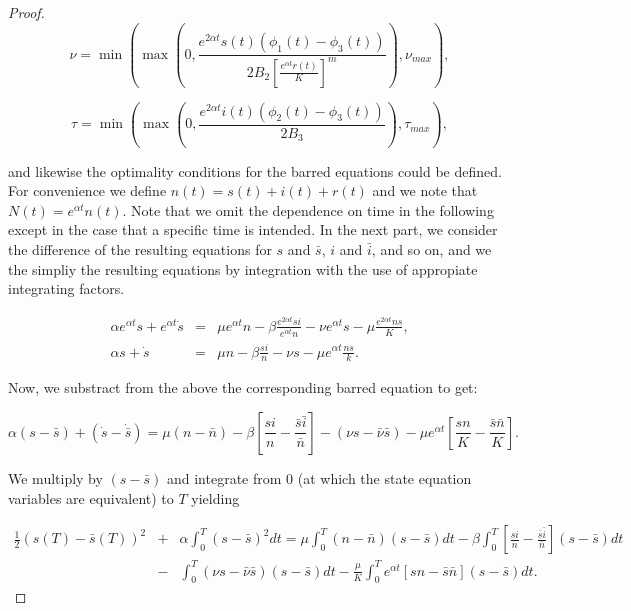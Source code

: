 \begin{proof}
\begin{equation}\label{eq.1.4.33}
\nu=\min\left(\max\left(0,\frac{e^{2\alpha 
t}s(t)(\phi_1(t)-\phi_3(t))}{2B_2\left[\frac{e^{\alpha 
t}r(t)}{K}\right]^m}\right),\nu_{max}\right),
\end{equation}

\begin{equation}\label{eq.1.4.34}
\tau=\min\left(\max\left(0,\frac{e^{2\alpha 
t}i(t)(\phi_2(t)-\phi_3(t))}{2B_3}\right),\tau_{max}\right),
\end{equation}

and likewise the optimality conditions for the barred equations could be 
defined. For convenience we define $n(t)=s(t)+i(t)+r(t)$ and we note that 
$N(t)=e^{\alpha t}n(t)$. Note that we omit the dependence on time in the 
following except in the case that a specific time is intended. In the next 
part, we consider the difference of the resulting equations for $s$ and 
$\bar{s}$, $i$ and $\bar{i}$, and so on, and we the simpliy the resulting 
equations by integration with the use of appropiate integrating factors.

\begin{eqnarray*}
	\alpha e^{\alpha t}s+ e^{\alpha t}\dot{s}&=&\mu e^{\alpha t}n-\beta 
	\frac{e^{2\alpha t}si}{e^{\alpha t} n}-\nu e^{\alpha t} s-\mu 
	\frac{e^{2\alpha t} ns}{K},\\
	\alpha s+\dot{s}&=&\mu n-\beta \frac{si}{n}-\nu s-\mu e^{\alpha t}\frac{n 
	s}{k}.
\end{eqnarray*}

Now, we substract from the above the corresponding barred equation to get:

\begin{equation*}
\alpha 
(s-\bar{s})+(\dot{s}-\dot{\bar{s}})=\mu(n-\bar{n})-\beta\left[\frac{si}{n}-\frac{\bar{s}\bar{i}}{\bar{n}}\right]-(\nu
 s-\bar{\nu}\bar{s})-\mu e^{\alpha 
t}\left[\frac{sn}{K}-\frac{\bar{s}\bar{n}}{K}\right]. 
\end{equation*}

We multiply by $(s-\bar{s})$ and integrate from 0 (at which  the state equation 
variables are equivalent) to $T$ yielding

\begin{eqnarray}
\frac{1}{2}(s(T)-\bar{s}(T))^2&+&\alpha\int_{0}^{T}(s-\bar{s})^2dt=\mu\int_{0}^{T}(n-\bar{n})(s-\bar{s})dt-\beta\int_{0}^{T}\left[\frac{si}{n}-\frac{\bar{s}\bar{i}}{\bar{n}}\right](s-\bar{s})dt\nonumber\\
&-&\int_{0}^{T}(\nu s-\bar{\nu}\bar{s})(s-\bar{s})dt-\frac{\mu}{K}\int_{0}^{T} 
e^{\alpha t}\left[sn-\bar{s}\bar{n}\right](s-\bar{s})dt. \label{eq.1.4.35}
\end{eqnarray}


\end{proof}
